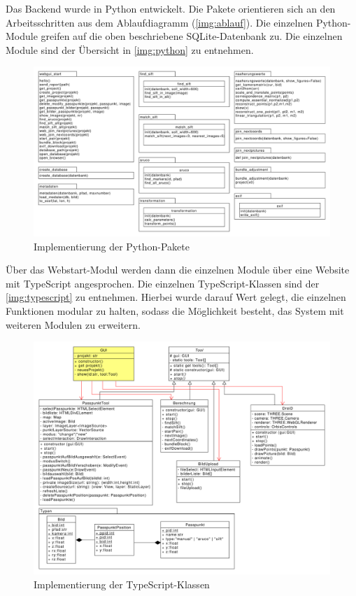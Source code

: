 \documentclass[./00PhotoBox.tex]{subfiles}
\begin{document}
Das Backend wurde in Python entwickelt. Die Pakete orientieren sich an den Arbeitsschritten aus dem Ablaufdiagramm (\autoref{img:ablauf}). Die einzelnen Python-Module greifen auf die oben beschriebene SQLite-Datenbank zu. Die einzelnen Module sind der Übersicht in \autoref{img:python} zu entnehmen.

\begin{figure}[!htbp]
    \centering
    \includegraphics[width=1\textwidth]{./img/python.pdf}
    \centering
    \caption{Implementierung der Python-Pakete} %
    \label{img:python} %
\end{figure}

Über das Webstart-Modul werden dann die einzelnen Module über eine Website mit TypeScript angesprochen. Die einzelnen TypeScript-Klassen sind der \autoref{img:typescript} zu entnehmen. Hierbei wurde darauf Wert gelegt, die einzelnen Funktionen modular zu halten, sodass die Möglichkeit besteht, das System mit weiteren Modulen zu erweitern.

\begin{figure}[!htbp]
    \centering
    \includegraphics[width=1\textwidth]{./img/typescript.pdf}
    \centering
    \caption{Implementierung der TypeScript-Klassen} %
    \label{img:typescript} %
\end{figure}
\end{document}
